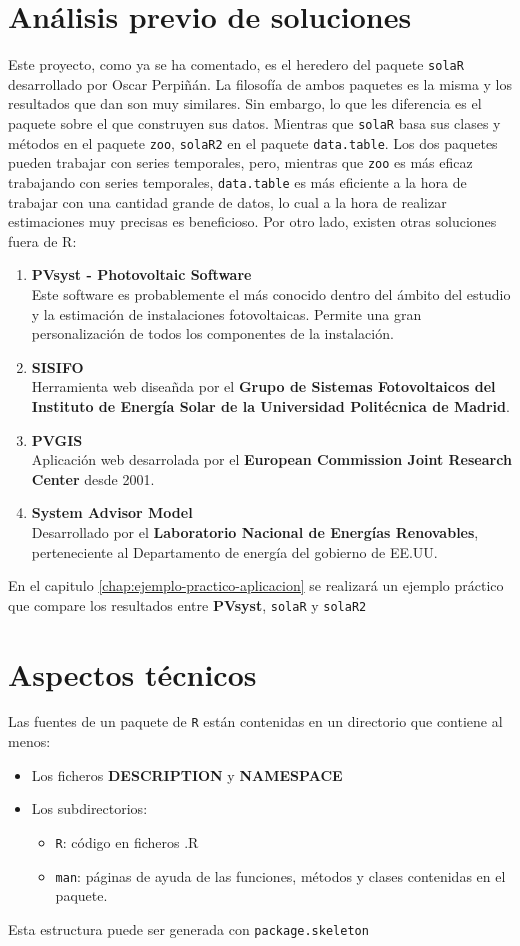 \section{Análisis previo de soluciones}
\label{sec:org930a843}
Este proyecto, como ya se ha comentado, es el heredero del paquete \texttt{solaR} desarrollado por Oscar Perpiñán. La filosofía de ambos paquetes es la misma y los resultados que dan son muy similares. Sin embargo, lo que les diferencia es el paquete sobre el que construyen sus datos.
Mientras que \texttt{solaR} basa sus clases y métodos en el paquete \texttt{zoo}, \texttt{solaR2} en el paquete \texttt{data.table}. Los dos paquetes pueden trabajar con series temporales, pero, mientras que \texttt{zoo} es más eficaz trabajando con series temporales, \texttt{data.table} es más eficiente a la hora de trabajar con una cantidad grande de datos, lo cual a la hora de realizar estimaciones muy precisas es beneficioso.
Por otro lado, existen otras soluciones fuera de R:
\begin{enumerate}
\item \textbf{PVsyst - Photovoltaic Software}\\[0pt]
Este software es probablemente el más conocido dentro del ámbito del estudio y la estimación de instalaciones fotovoltaicas. Permite una gran personalización de todos los componentes de la instalación.
\item \textbf{SISIFO}\\[0pt]
Herramienta web diseañda por el \textbf{Grupo de Sistemas Fotovoltaicos del Instituto de Energía Solar de la Universidad Politécnica de Madrid}.
\item \textbf{PVGIS}\\[0pt]
Aplicación web desarrolada por el \textbf{European Commission Joint Research Center} desde 2001.
\item \textbf{System Advisor Model}\\[0pt]
Desarrollado por el \textbf{Laboratorio Nacional de Energías Renovables}, perteneciente al Departamento de energía del gobierno de EE.UU.
\end{enumerate}
En el capitulo \ref{chap:ejemplo-practico-aplicacion} se realizará un ejemplo práctico que compare los resultados entre \textbf{PVsyst}, \texttt{solaR} y \texttt{solaR2}
\section{Aspectos técnicos}
\label{sec:orgfecbc49}
\label{sec:aspectos-tecnicos}
Las fuentes de un paquete de \texttt{R} están contenidas en un directorio que contiene al menos:
\begin{itemize}
\item Los ficheros \textbf{DESCRIPTION} y \textbf{NAMESPACE}
\item Los subdirectorios:
\begin{itemize}
\item \texttt{R}: código en ficheros .R
\item \texttt{man}: páginas de ayuda de las funciones, métodos y clases contenidas en el paquete.
\end{itemize}
\end{itemize}
Esta estructura puede ser generada con \texttt{package.skeleton}

